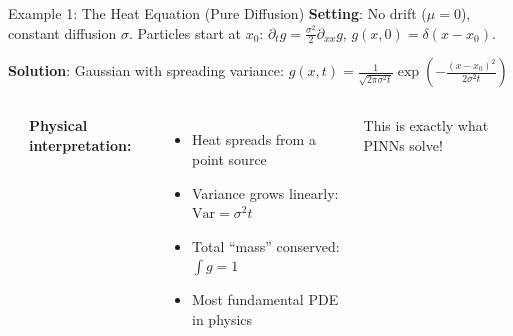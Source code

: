 \documentclass[aspectratio=169,11pt]{beamer}
\newcommand{\emphc}[1]{\textcolor{harvardcrimson}{#1}}
\begin{document}
\begin{frame}{Example 1: The Heat Equation (Pure Diffusion)}
\small
\textbf{Setting}: No drift ($\mu = 0$), constant diffusion $\sigma$. Particles start at $x_0$:
$\partial_t g = \frac{\sigma^2}{2}\partial_{xx}g$, \; $g(x,0) = \delta(x - x_0)$.

\textbf{Solution}: Gaussian with spreading variance:
$g(x,t) = \frac{1}{\sqrt{2\pi\sigma^2 t}}\exp\!\left(-\frac{(x-x_0)^2}{2\sigma^2 t}\right)$

\begin{columns}[T]
\begin{center}
\end{center}

\textbf{Physical interpretation:}
\begin{itemize}\itemsep1pt
    \item Heat spreads from a point source
    \item Variance grows linearly: $\text{Var} = \sigma^2 t$
    \item Total ``mass'' conserved: $\int g = 1$
    \item \emphc{Most fundamental PDE in physics}
\end{itemize}

\vspace{0.2em}
{\small This is exactly what PINNs solve!}
\end{columns}
\end{frame}
\end{document}
